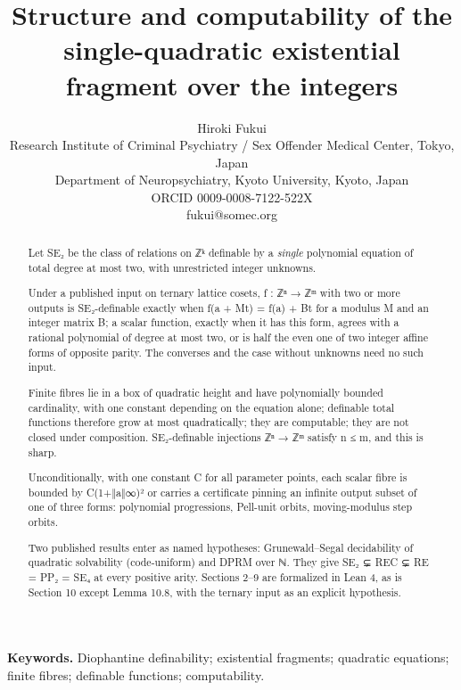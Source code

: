 \documentclass[11pt]{article}
\theoremstyle{plain}
\theoremstyle{definition}
\theoremstyle{remark}
\theoremstyle{plain}
\theoremstyle{definition}
\theoremstyle{remark}
\theoremstyle{plain}
\theoremstyle{definition}
\theoremstyle{remark}
\begin{document}
\title{Structure and computability of the single-quadratic existential fragment over the integers}
\author{Hiroki Fukui\\ \small Research Institute of Criminal Psychiatry / Sex Offender Medical Center, Tokyo, Japan\\ \small Department of Neuropsychiatry, Kyoto University, Kyoto, Japan\\ \small ORCID 0009-0008-7122-522X\\ \small fukui@somec.org}
\date{}
\maketitle
\linenumbers
\begin{abstract}
Let SE₂ be the class of relations on ℤᵏ definable by a \emph{single} polynomial equation of total degree at most two, with unrestricted integer unknowns.

Under a published input on ternary lattice cosets, f : ℤⁿ → ℤᵐ with two or more outputs is SE₂-definable exactly when f(a + Mt) = f(a) + Bt for a modulus M and an integer matrix B; a scalar function, exactly when it has this form, agrees with a rational polynomial of degree at most two, or is half the even one of two integer affine forms of opposite parity. The converses and the case without unknowns need no such input.

Finite fibres lie in a box of quadratic height and have polynomially bounded cardinality, with one constant depending on the equation alone; definable total functions therefore grow at most quadratically; they are computable; they are not closed under composition. SE₂-definable injections ℤⁿ → ℤᵐ satisfy n ≤ m, and this is sharp.

Unconditionally, with one constant C for all parameter points, each scalar fibre is bounded by C(1+‖a‖∞)² or carries a certificate pinning an infinite output subset of one of three forms: polynomial progressions, Pell-unit orbits, moving-modulus step orbits.

Two published results enter as named hypotheses: Grunewald–Segal decidability of quadratic solvability (code-uniform) and DPRM over ℕ. They give SE₂ ⊊ REC ⊊ RE = PP₂ = SE₄ at every positive arity. Sections 2–9 are formalized in Lean 4, as is Section 10 except Lemma 10.8, with the ternary input as an explicit hypothesis.

\end{abstract}
\noindent\textbf{Keywords.} Diophantine definability; existential fragments; quadratic equations; finite fibres; definable functions; computability.
\end{document}
